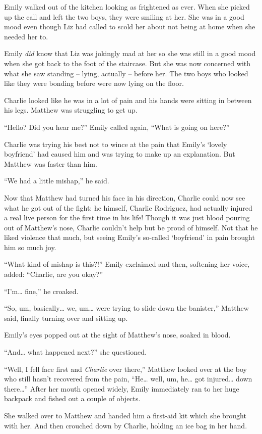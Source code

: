 Emily walked out of the kitchen looking as frightened as ever. When she picked up the call and left the two boys, they were smiling at her. She was in a good mood even though Liz had called to scold her about not being at home when she needed her to.

Emily \textit{did} know that Liz was jokingly mad at her so she was still in a good mood when she got back to the foot of the staircase. But she was now concerned with what she saw standing – lying, actually – before her. The two boys who looked like they were bonding before were now lying on the floor.

Charlie looked like he was in a lot of pain and his hands were sitting in between his legs. Matthew was struggling to get up.

“Hello? Did you hear me?” Emily called again, “What is going on here?”

Charlie was trying his best not to wince at the pain that Emily’s ‘lovely boyfriend’ had caused him and was trying to make up an explanation. But Matthew was faster than him.

“We had a little mishap,” he said.

Now that Matthew had turned his face in his direction, Charlie could now see what he got out of the fight: he himself, Charlie Rodriguez, had actually injured a real live person for the first time in his life! Though it was just blood pouring out of Matthew’s nose, Charlie couldn’t help but be proud of himself. Not that he liked violence that much, but seeing Emily’s so-called ‘boyfriend’ in pain brought him so much joy.

“What kind of mishap is this?!” Emily exclaimed and then, softening her voice, added: “Charlie, are you okay?”

“I’m… fine,” he croaked.

“So, um, basically… we, um… were trying to slide down the banister,” Matthew said, finally turning over and sitting up.

Emily’s eyes popped out at the sight of Matthew’s nose, soaked in blood.

“And… what happened next?” she questioned.

“Well, I fell face first and \textit{Charlie} over there,” Matthew looked over at the boy who still hasn’t recovered from the pain, “He… well, um, he… got injured… down there…”
After her mouth opened widely, Emily immediately ran to her huge backpack and fished out a couple of objects.

She walked over to Matthew and handed him a first-aid kit which she brought with her. And then crouched down by Charlie, holding an ice bag in her hand.

